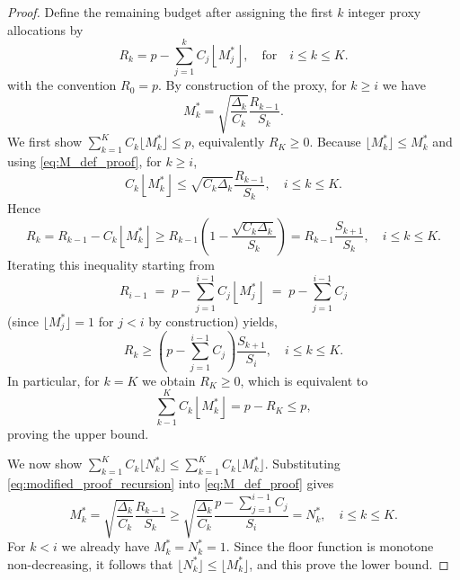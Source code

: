 \begin{proof}
Define the remaining budget after assigning the first $k$ integer proxy allocations by 
\[
R_k = p-\sum_{j=1}^k C_j \left\lfloor M_j^* \right\rfloor, \quad \text{for}\quad i\le k\le K.
\]
with the convention $R_0=p$. By construction of the proxy, for $k\ge i$ we have
%
\begin{equation}\label{eq:M_def_proof}
    M_k^*=\sqrt{\frac{\Delta_k}{C_k}}\frac{R_{k-1}}{S_k}.
\end{equation}
%
We first show $\sum_{k=1}^K C_k\lfloor M_k^*\rfloor \le p$, equivalently $R_K\ge 0$.
Because $\lfloor M_k^*\rfloor \le M_k^*$ and using \eqref{eq:M_def_proof}, for $k\ge i$,
\[
C_k \left\lfloor M_k^* \right\rfloor\le \sqrt{C_k\Delta_k}\frac{R_{k-1}}{S_k}, \quad i\le k\le K.
\]
Hence
%
\begin{equation*}
    R_k = R_{k-1}-C_k  \left\lfloor M_k^* \right\rfloor\ge R_{k-1}\left(1-\frac{\sqrt{C_k\Delta_k}}{S_k}\right) = R_{k-1}\frac{S_{k+1}}{S_k}, \quad i\le k\le K.
\end{equation*}
%
Iterating this inequality starting from
%
\[
R_{i-1} \;=\; p - \sum_{j=1}^{i-1} C_j \left\lfloor M_j^*\right\rfloor
         \;=\; p - \sum_{j=1}^{i-1} C_j
\]
%
(since $\lfloor M_j^*\rfloor =1$ for $j<i$ by construction) yields,
%
\begin{equation}\label{eq:modified_proof_recursion}
R_{k}\ge \left(p-\sum_{j=1}^{i-1}C_j\right)\frac{S_{k+1}}{S_i},\quad i\le k\le K.
\end{equation}
%
In particular, for $k=K$ we obtain $R_K\ge 0$, which is equivalent to
%
\begin{equation*}\label{eq:modified_total_cost}
    \sum_{k-1}^K C_k\left\lfloor M_k^* \right\rfloor=p-R_K\le p,
\end{equation*}
proving the upper bound.

We now show
$\sum_{k=1}^K C_k\lfloor N_k^*\rfloor \le \sum_{k=1}^K C_k\lfloor M_k^*\rfloor$.
Substituting \eqref{eq:modified_proof_recursion} into \eqref{eq:M_def_proof} gives
%
\begin{equation}\label{eq:Modified_nondecreasing_sample_size_proof}
    M_k^* = \sqrt{\frac{\Delta_k}{C_k}}\frac{R_{k-1}}{S_k}\ge \sqrt{\frac{\Delta_k}{C_k}}\frac{p-\sum_{j=1}^{i-1}C_j}{S_i}=N_k^*, \quad i\le k\le K.
\end{equation}
%
For $k<i$ we already have $M_k^*=N_k^*=1$. Since the floor function is monotone non-decreasing, it follows that $\lfloor N_k^* \rfloor\le \lfloor M_k^* \rfloor$, and this prove the lower bound.
\end{proof}



